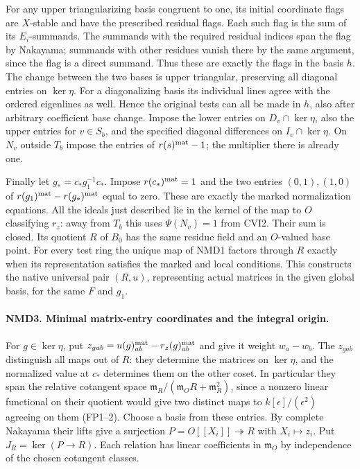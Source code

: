 For any upper triangularizing basis congruent to one, its initial
coordinate flags are $X$-stable and have the prescribed residual
flags. Each such flag is the sum of its $E_i$-summands. The
summands with the required residual indices span the flag by
Nakayama; summands with other residues vanish there by the same
argument, since the flag is a direct summand. Thus these are exactly
the flags in the basis $h$. The change between the two bases is
upper triangular, preserving all diagonal entries on $\ker\eta$.
For a diagonalizing basis its individual lines agree with the
ordered eigenlines as well. Hence the original tests can all be
made in $h$, also after arbitrary coefficient base change.
Impose the lower entries on $D_v\cap\ker\eta$, also the upper
entries for $v\in S_b$, and the specified diagonal differences on
$I_v\cap\ker\eta$. On $N_v$ outside $T_b$ impose the entries
of $r(s)^{\rm mat}-1$; the multiplier there is already one.

Finally let $g_* = c_*g_1^{-1}c_*$. Impose $r(c_*)^{\rm mat}=1$
and the two entries $(0,1),(1,0)$ of
$r(g_1)^{\rm mat}-r(g_*)^{\rm mat}$ equal to zero.
These are exactly the marked normalization equations.
All the ideals just described lie in the kernel of the map to $O$
classifying $r_z$: away from $T_b$ this uses $\Psi(N_v)=1$ from
CVI2. Their sum is closed. Its quotient $R$ of $B_0$ has the same
residue field and an $O$-valued base point. For every test ring the
unique map of NMD1 factors through $R$ exactly when its representation
satisfies the marked and local conditions. This constructs the native
universal pair $(R,u)$, representing actual matrices in the given
global basis, for the same $F$ and $g_1$.

\paragraph{NMD3. Minimal matrix-entry coordinates and the integral origin.}
\label{claim:NMD3}
For $g\in\ker\eta$, put
$z_{gab}=u(g)^{\rm mat}_{ab}-r_z(g)^{\rm mat}_{ab}$ and give it
weight $w_a-w_b$. The $z_{gab}$ distinguish all maps out of $R$:
they determine the matrices on $\ker\eta$, and the normalized
value at $c_*$ determines them on the other coset. In particular
they span the relative cotangent space
$\mathfrak m_R/(\mathfrak m_OR+\mathfrak m_R^2)$, since a nonzero
linear functional on their quotient would give two distinct maps
to $k[\epsilon]/(\epsilon^2)$ agreeing on them (FP1--2).
Choose a basis from these entries. By complete Nakayama their
lifts give a surjection $P=O[[X_i]]\twoheadrightarrow R$ with
$X_i\mapsto z_i$. Put $J_R=\ker(P\to R)$. Each relation has linear
coefficients in $\mathfrak m_O$ by independence of the chosen
cotangent classes.

